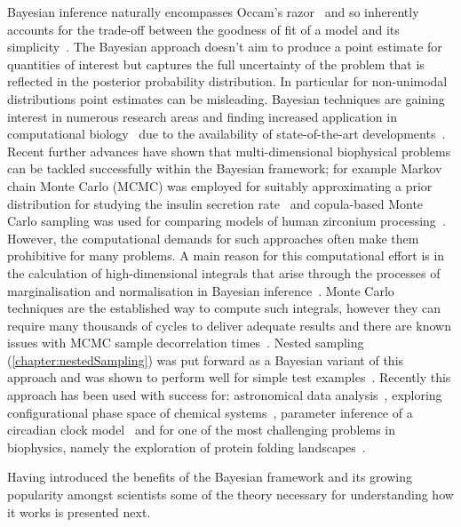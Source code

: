 Bayesian inference naturally encompasses Occam's razor~\cite{blumer1987occam, rasmussen2001occam} and so inherently accounts for the trade-off between the goodness of fit of a model and its simplicity~\cite{MacKay91bayesianinterpolation}.
The Bayesian approach doesn't aim to produce a point estimate for quantities of interest but captures the full uncertainty of the problem that is reflected in the posterior probability distribution.
In particular for non-unimodal distributions point estimates can be misleading.
Bayesian techniques are gaining interest in numerous research areas and finding increased application in computational biology~\cite{posada2004,wilkinson2007} due to the availability of state-of-the-art developments~\cite{baldi2001,toni2009,thorne2012,calderhead2011,calderhead2009,eydgahi2013sorger}.
Recent further advances have shown that multi-dimensional biophysical problems can be tackled successfully within the Bayesian framework; for example Markov chain Monte Carlo (MCMC) was employed for suitably approximating a prior distribution for studying the insulin secretion rate~\cite{heuett2012} and copula-based Monte Carlo sampling was used for comparing models of human zirconium processing~\cite{schmidl2012}.
However, the computational demands for such approaches often make them prohibitive for many problems.
A main reason for this computational effort is in the calculation of high-dimensional integrals that arise through the processes of marginalisation and normalisation in Bayesian inference~\cite{jeffreys1961,mackay2003}.
Monte Carlo techniques are the established way to compute such integrals, however they can require many thousands of cycles to deliver adequate results and there are known issues with MCMC sample decorrelation times~\cite{lartillot2006}.
Nested sampling~\cite{Skilling2006} (\autoref{chapter:nestedSampling}) was put forward as a Bayesian variant of this approach and was shown to perform well for simple test examples~\cite{sivia2006}.
Recently this approach has been used with success for: astronomical data analysis~\cite{mukherjee2006, feroz2008}, exploring configurational phase space of chemical systems~\cite{partay2010}, parameter inference of a circadian clock model~\cite{aitken2013} and for one of the most challenging problems in biophysics, namely the exploration of protein folding landscapes~\cite{burkoff2012}.

Having introduced the benefits of the Bayesian framework and its growing popularity amongst scientists some of the theory necessary for understanding how it works is presented next.

